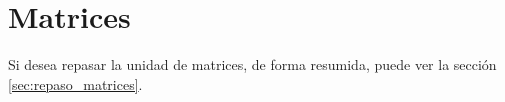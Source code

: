 \section{Matrices}

Si desea repasar la unidad de matrices, de forma resumida, puede ver la sección \ref{sec:repaso_matrices}.